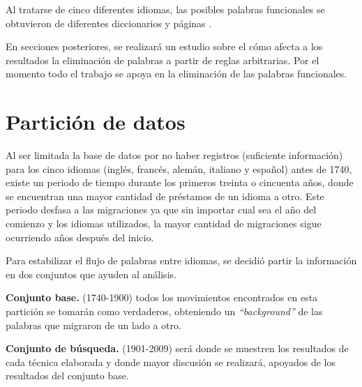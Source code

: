 Al tratarse de cinco diferentes idiomas, las posibles palabras funcionales se obtuvieron de diferentes diccionarios y páginas \cite{englishdic, frenchdic, germandic, italiandic, spanishdic}.

En secciones posteriores, se realizará un estudio sobre el cómo afecta a los resultados la eliminación de palabras a partir de reglas arbitrarias.  Por el momento todo el trabajo se apoya en la eliminación de las palabras funcionales.


\section{Partición de datos}

Al ser limitada la base de datos por no haber registros (suficiente información) para los cinco idiomas (inglés, francés, alemán, italiano y español) antes de 1740,  existe un periodo de tiempo durante los primeros treinta o cincuenta años, donde se encuentran una mayor cantidad de préstamos de un idioma a otro. Este periodo desfasa a  las migraciones ya que sin importar cual sea el año del comienzo y los idiomas utilizados,  la mayor cantidad de migraciones sigue ocurriendo años después del inicio.   

Para estabilizar el flujo de palabras entre idiomas, se decidió partir la información en dos conjuntos que ayuden al análisis.

\textbf{Conjunto base.} (1740-1900) todos los movimientos encontrados en esta partición se tomarán como verdaderos,  obteniendo un \textit{“background”} de las palabras que migraron de un lado a otro.

\textbf{Conjunto de búsqueda.} (1901-2009) será donde se muestren los resultados de cada técnica elaborada y donde mayor discusión se realizará, apoyados de los resultados del conjunto base. 



